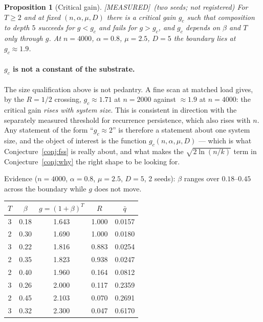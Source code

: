 \documentclass[11pt]{article}
\theoremstyle{definition}
\theoremstyle{plain}
\newtheorem{proposition}[lemma]{Proposition}
\newcommand{\MEASURED}{\textnormal{\footnotesize\textsf{[MEASURED]}}}
\begin{document}
\begin{proposition}[Critical gain]\label{conj:gc} \MEASURED\ (two seeds; not registered)
For $T \ge 2$ and at fixed $(n,\alpha,\mu,D)$ there is a critical gain $g_c$
such that composition to depth $5$ succeeds for $g < g_c$ and fails for
$g > g_c$, and $g_c$ depends on $\beta$ and $T$ only through $g$. At $n=4000$,
$\alpha=0.8$, $\mu=2.5$, $D=5$ the boundary lies at $g_c \approx 1.9$.
\end{proposition}

\paragraph{$g_c$ is not a constant of the substrate.} The size qualification
above is not pedantry. A fine scan at matched load gives, by the $R=1/2$
crossing, $g_c \approx 1.71$ at $n=2000$ against $\approx 1.9$ at $n=4000$: the
critical gain \emph{rises with system size}. This is consistent in direction
with the separately measured threshold for recurrence persistence, which also
rises with $n$. Any statement of the form ``$g_c \approx 2$'' is therefore a
statement about one system size, and the object of interest is the function
$g_c(n,\alpha,\mu,D)$ --- which is what Conjecture~\ref{conj:fss} is really
about, and what makes the $\sqrt{2\ln(n/k)}$ term in
Conjecture~\ref{conj:why} the right shape to be looking for.

Evidence ($n=4000$, $\alpha=0.8$, $\mu=2.5$, $D=5$, 2 seeds): $\beta$ ranges
over $0.18$--$0.45$ across the boundary while $g$ does not move.

\begin{center}
\begin{tabular}{ccccc}
\toprule
$T$ & $\beta$ & $g=(1+\beta)^T$ & $R$ & $\bar q$ \\
\midrule
3 & 0.18 & 1.643 & 1.000 & 0.0157 \\
2 & 0.30 & 1.690 & 1.000 & 0.0180 \\
3 & 0.22 & 1.816 & 0.883 & 0.0254 \\
2 & 0.35 & 1.823 & 0.938 & 0.0247 \\
2 & 0.40 & 1.960 & 0.164 & 0.0812 \\
3 & 0.26 & 2.000 & 0.117 & 0.2359 \\
2 & 0.45 & 2.103 & 0.070 & 0.2691 \\
3 & 0.32 & 2.300 & 0.047 & 0.6170 \\
\bottomrule
\end{tabular}
\end{center}
\end{document}
